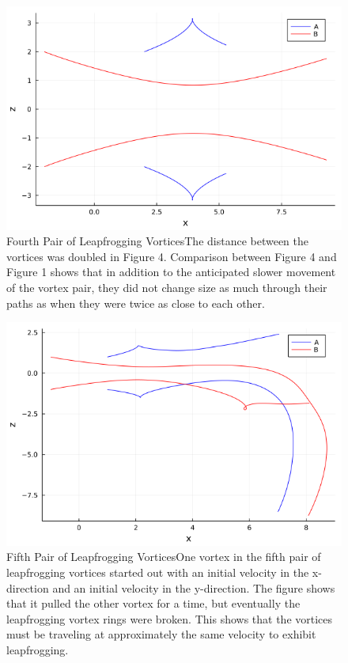 \documentclass{article}
\begin{document}
\begin{figure}[htb]
	\centering
	\includegraphics[width=\textwidth]{Graph_D.png}
	\caption{Fourth Pair of Leapfrogging Vortices\newline     The distance between the vortices was doubled in Figure 4. Comparison between Figure 4 and Figure 1 shows that in addition to the anticipated slower movement of the vortex pair, they did not change size as much through their paths as when they were twice as close to each other.}
	\label{fig:vortexpaths}
\end{figure} 

\begin{figure}[htb]
	\centering
	\includegraphics[width=\textwidth]{Graph_E.png}
	\caption{Fifth Pair of Leapfrogging Vortices\newline     One vortex in the fifth pair of leapfrogging vortices started out with an initial velocity in the x-direction and an initial velocity in the y-direction. The figure shows that it pulled the other vortex for a time, but eventually the leapfrogging vortex rings were broken. This shows that the vortices must be traveling at approximately the same velocity to exhibit leapfrogging.}
	\label{fig:vortexpaths}
\end{figure} 
\end{document}
